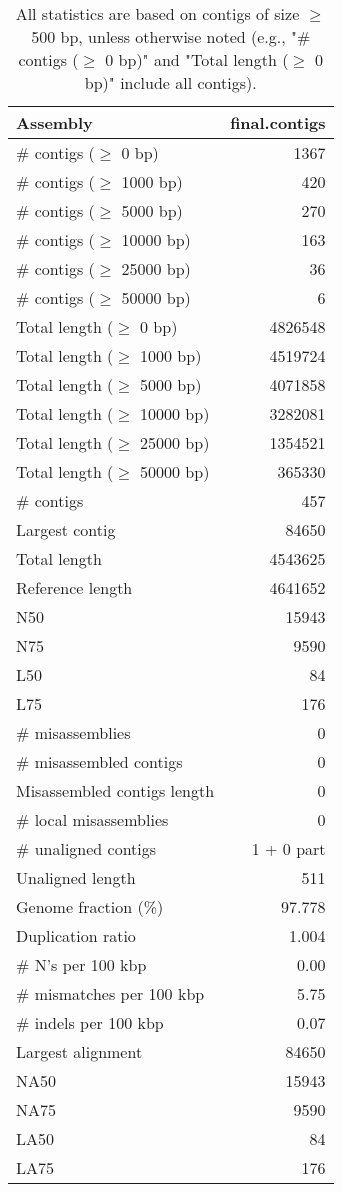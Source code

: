 \documentclass[12pt,a4paper]{article}
\begin{document}
\begin{table}[ht]
\begin{center}
\caption{All statistics are based on contigs of size $\geq$ 500 bp, unless otherwise noted (e.g., "\# contigs ($\geq$ 0 bp)" and "Total length ($\geq$ 0 bp)" include all contigs).}
\begin{tabular}{|l*{1}{|r}|}
\hline
Assembly & final.contigs \\ \hline
\# contigs ($\geq$ 0 bp) & 1367 \\ \hline
\# contigs ($\geq$ 1000 bp) & 420 \\ \hline
\# contigs ($\geq$ 5000 bp) & 270 \\ \hline
\# contigs ($\geq$ 10000 bp) & 163 \\ \hline
\# contigs ($\geq$ 25000 bp) & 36 \\ \hline
\# contigs ($\geq$ 50000 bp) & 6 \\ \hline
Total length ($\geq$ 0 bp) & 4826548 \\ \hline
Total length ($\geq$ 1000 bp) & 4519724 \\ \hline
Total length ($\geq$ 5000 bp) & 4071858 \\ \hline
Total length ($\geq$ 10000 bp) & 3282081 \\ \hline
Total length ($\geq$ 25000 bp) & 1354521 \\ \hline
Total length ($\geq$ 50000 bp) & 365330 \\ \hline
\# contigs & 457 \\ \hline
Largest contig & 84650 \\ \hline
Total length & 4543625 \\ \hline
Reference length & 4641652 \\ \hline
N50 & 15943 \\ \hline
N75 & 9590 \\ \hline
L50 & 84 \\ \hline
L75 & 176 \\ \hline
\# misassemblies & 0 \\ \hline
\# misassembled contigs & 0 \\ \hline
Misassembled contigs length & 0 \\ \hline
\# local misassemblies & 0 \\ \hline
\# unaligned contigs & 1 + 0 part \\ \hline
Unaligned length & 511 \\ \hline
Genome fraction (\%) & 97.778 \\ \hline
Duplication ratio & 1.004 \\ \hline
\# N's per 100 kbp & 0.00 \\ \hline
\# mismatches per 100 kbp & 5.75 \\ \hline
\# indels per 100 kbp & 0.07 \\ \hline
Largest alignment & 84650 \\ \hline
NA50 & 15943 \\ \hline
NA75 & 9590 \\ \hline
LA50 & 84 \\ \hline
LA75 & 176 \\ \hline
\end{tabular}
\end{center}
\end{table}
\end{document}
